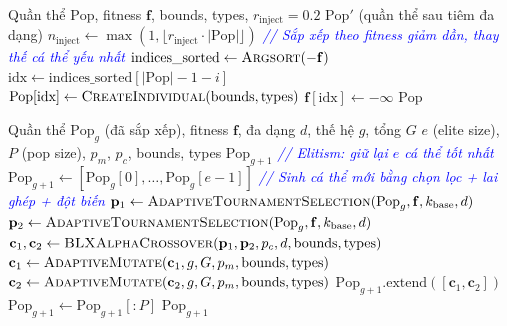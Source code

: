 \documentclass[12pt,a4paper]{article}
\begin{document}
\begin{algorithm}[H]
\caption{Tiêm đa dạng vào quần thể (\textsc{InjectDiversity})}
\label{alg:ga_inject}
\begin{algorithmic}[1]
\Require Quần thể $\text{Pop}$, fitness $\mathbf{f}$, bounds, types, $r_{\text{inject}} = 0.2$
\Ensure $\text{Pop}'$ (quần thể sau tiêm đa dạng)
\State $n_{\text{inject}} \gets \max(1, \lfloor r_{\text{inject}} \cdot |\text{Pop}| \rfloor)$
\Statex \textcolor{blue}{\textit{// Sắp xếp theo fitness giảm dần, thay thế cá thể yếu nhất}}
\State $\text{indices\_sorted} \gets \textsc{Argsort}(-\mathbf{f})$
    \State $\text{idx} \gets \text{indices\_sorted}[|\text{Pop}| - 1 - i]$ 
    \State $\text{Pop}[\text{idx}] \gets \textsc{CreateIndividual}(\text{bounds}, \text{types})$ 
    \State $\mathbf{f}[\text{idx}] \gets -\infty$ 
\EndFor
\State \Return $\text{Pop}$
\end{algorithmic}
\end{algorithm}

\begin{algorithm}[H]
\caption{Tạo thế hệ mới (\textsc{CreateNextGeneration})}
\label{alg:ga_next_gen}
\begin{algorithmic}[1]
\Require Quần thể $\text{Pop}_g$ (đã sắp xếp), fitness $\mathbf{f}$, đa dạng $d$, thế hệ $g$, tổng $G$
\Require $e$ (elite size), $P$ (pop size), $p_m$, $p_c$, bounds, types
\Ensure $\text{Pop}_{g+1}$
\Statex \textcolor{blue}{\textit{// Elitism: giữ lại $e$ cá thể tốt nhất}}
\State $\text{Pop}_{g+1} \gets [\text{Pop}_g[0], \ldots, \text{Pop}_g[e-1]]$ 
\Statex \textcolor{blue}{\textit{// Sinh cá thể mới bằng chọn lọc + lai ghép + đột biến}}
    \State $\mathbf{p}_1 \gets \textsc{AdaptiveTournamentSelection}(\text{Pop}_g, \mathbf{f}, k_{\text{base}}, d)$
    \State $\mathbf{p}_2 \gets \textsc{AdaptiveTournamentSelection}(\text{Pop}_g, \mathbf{f}, k_{\text{base}}, d)$
    \State $\mathbf{c}_1, \mathbf{c}_2 \gets \textsc{BLXAlphaCrossover}(\mathbf{p}_1, \mathbf{p}_2, p_c, d, \text{bounds}, \text{types})$
    \State $\mathbf{c}_1 \gets \textsc{AdaptiveMutate}(\mathbf{c}_1, g, G, p_m, \text{bounds}, \text{types})$
    \State $\mathbf{c}_2 \gets \textsc{AdaptiveMutate}(\mathbf{c}_2, g, G, p_m, \text{bounds}, \text{types})$
    \State $\text{Pop}_{g+1}.\text{extend}([\mathbf{c}_1, \mathbf{c}_2])$
\EndWhile
\State $\text{Pop}_{g+1} \gets \text{Pop}_{g+1}[:P]$ 
\State \Return $\text{Pop}_{g+1}$
\end{algorithmic}
\end{algorithm}
\end{document}
